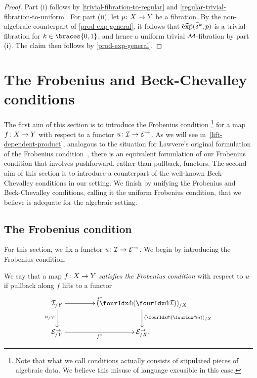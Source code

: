 \documentclass[reqno,10pt,a4paper,oneside,draft]{amsart}
\begin{document}
\begin{proof}
Part (i) follows by \cref{trivial-fibration-to-regular} and \cref{regular-trivial-fibration-to-uniform}.
For part (ii), let $p \co X \to Y$ be a fibration.
By the non-algebraic counterpart of \cref{prod-exp-general}, it follows that $\hatexp(\bar{\delta}^k, p)$ is a trivial fibration for $k \in \braces{0, 1}$, and hence a uniform trivial $\cal{M}$-fibration by part (i).
The claim then follows by \cref{prod-exp-general}.
\end{proof}


\section{The Frobenius and Beck-Chevalley conditions}
\label{sec:frobc}

The first aim of this section is to introduce the Frobenius condition%
\footnote{
Note that what we call conditions actually consists of stipulated pieces of algebraic data.
We believe this misuse of language excusible in this case.
} for a map $f \co X \to Y$ with respect to a functor $u \co \cal{I} \to \catE^\to$.
As we will see in~\cref{lift-dependent-product}, analogous to the situation for Lawvere's original formulation of the Frobenius condition~\cite{lawvere-equality}, there is an equivalent formulation of our Frobenius condition that involves pushforward, rather than pullback, functors.
The second aim of this section is to introduce a counterpart of the well-known Beck-Chevalley conditions in our setting.
We finish by unifying the Frobenius and Beck-Chevalley conditions, calling it the uniform Frobenius condition, that we believe is adequate for the algebraic setting.

\subsection*{The Frobenius condition}

For this section, we fix a functor $u \co \cal{I} \to \catE^\to$.
We begin by introducing the Frobenius condition.

\begin{definition} \label{thm:frobenius-def}
We say that a map $f \co X \to Y$ \emph{satisfies the Frobenius condition} with respect to $u$ if pullback along $f$ lifts to a functor
\[
\xymatrix@C=1.5cm{
  \cal{I}_{/Y}
  \ar[r]^{f^*}
  \ar[d]_{u_{/Y}}
&
  (\liftl{(\liftr{\cal{I}})})_{/X}
  \ar[d]^{(\liftl{(\liftr{u})})_{/X}}
\\
  \catE_{/Y}^\to \ar[r]_{f^*}
&
  \catE_{/X}^\to
\rlap{.}}
\]
\end{definition}
\end{document}
